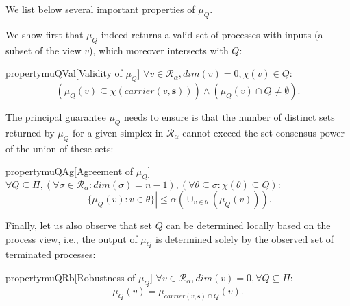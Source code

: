 \documentclass[a4paper]{article}
\def\R{\ensuremath{\mathcal{R}}}
\def\s {\mathbf{s}}
\def\Car{\mathit{carrier}}
\begin{document}
\noindent
We list below several important properties of $\mu_Q$.

We show first that $\mu_Q$ indeed returns a valid set of processes
with inputs (a subset of the view $v$), which moreover intersects with $Q$:
\begin{restatable}{property}{muQVal}{[Validity of $\mu_Q$]\label{muQ_validity}}
$\forall v\in\R_\alpha, {\mathit{dim}}(v)=0, \chi(v)\in Q : $
\[(\mu_Q(v)\subseteq\chi(\Car(v,\s)))\wedge(\mu_Q(v)\cap Q\neq\emptyset){}.\]
\end{restatable}

\noindent
The principal guarantee $\mu_Q$ needs to ensure is that the number of
distinct sets returned by $\mu_Q$ for a given simplex in $\R_{\alpha}$
cannot exceed the set consensus power of the union of these sets:
\begin{restatable}{property}{muQAg}{[Agreement of $\mu_Q$]\label{muQ_agreement}}
$\forall Q\subseteq\Pi, (\forall \sigma\in\R_\alpha:{\mathit{dim}}(\sigma)= n-1),
(\forall \theta\subseteq\sigma: \chi(\theta)\subseteq Q) :$
\[ |\{\mu_Q(v):v\in\theta\}|\leq \alpha(\cup_{v\in\theta}(\mu_Q(v))){}.\]
\end{restatable}

\noindent Finally, let us also observe that set $Q$ 
can be determined locally based on the process view, i.e.,
the output of $\mu_Q$ is determined solely by the observed  set of
terminated processes: 
\begin{restatable}{property}{muQRb}{[Robustness of $\mu_Q$]}
$\forall v\in\R_\alpha, {\mathit{dim}}(v)=0, \forall Q\subseteq \Pi:$
\[\mu_Q(v) = \mu_{\Car(v,\s)\cap Q}(v){}.\]
\end{restatable}
\end{document}
